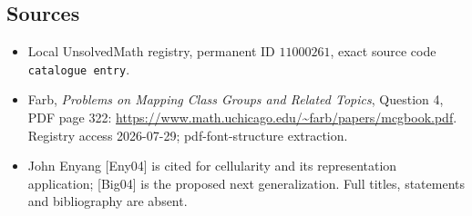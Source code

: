 \documentclass[11pt]{article}
\begin{document}
\subsection{Sources}
\begin{itemize}
\item Local UnsolvedMath registry, permanent ID \(11000261\), exact source code \texttt{catalogue entry}.
\item Farb, \emph{Problems on Mapping Class Groups and Related Topics}, Question 4, PDF page 322: \url{https://www.math.uchicago.edu/~farb/papers/mcgbook.pdf}. Registry access 2026-07-29; pdf-font-structure extraction.
\item John Enyang [Eny04] is cited for cellularity and its representation application; [Big04] is the proposed next generalization. Full titles, statements and bibliography are absent.
\end{itemize}
\end{document}
